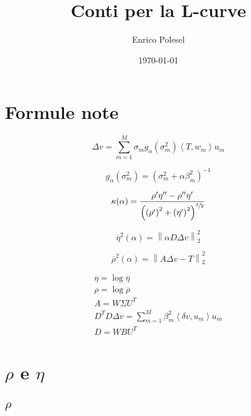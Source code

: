 \documentclass[a4paper,10pt]{article}
\title{Conti per la L-curve}
\author{Enrico Polesel}
\date{\today}
\theoremstyle{plain}
\theoremstyle{definition}
\theoremstyle{remark}
\newcommand{\obar}[1]{\overline{#1}}
\newcommand{\pa}[1]{\left(#1\right)}
\newcommand{\ang}[1]{\left<#1\right>}
\newcommand{\norm}[1]{\left\|#1\right\|}
\begin{document}
\maketitle

\section{Formule note}

\begin{equation}
  \Delta v = \sum _{m=1} ^M \sigma _m g_\alpha \pa{\sigma_m ^2 }
  \ang{T,w_m} u_m
\end{equation}

\begin{equation}
  g_\alpha \pa{\sigma_m ^2 } = \pa{ \sigma _m ^2 + \alpha \beta _m ^2
  } ^ {-1}
\end{equation}

\begin{equation}
  \kappa (\alpha) = \frac{ \rho ' \eta ''  - \rho '' \eta '}{
    \pa{\pa{\rho ' } ^2 + \pa{ \eta ' } ^2 } ^ {\sfrac{3}{2}}}
\end{equation}

\begin{equation}
  \obar{\eta} ^2 (\alpha) = \norm{ \alpha D \Delta v } _2 ^2
\end{equation}

\begin{equation}
  \obar{\rho} ^2 (\alpha) = \norm{ A \Delta v - T}_2 ^2
\end{equation}

\begin{align*}
  \eta = \log \obar{\eta} \\
  \rho = \log \obar{\rho} \\
  A = W \Sigma U ^T \\
  D^T D \Delta v = \sum _{m=1} ^ M \beta _m ^2 \ang{ \delta v , u_m }
  u_m \\
  D = WBU^T
\end{align*}


\section{$\rho$ e $\eta$}

\subsection{$\rho$}
\end{document}
